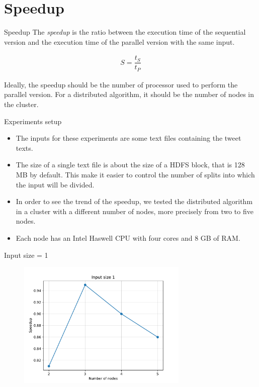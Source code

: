 \documentclass{beamer}
\begin{document}
\section{Speedup}

\begin{frame}{Speedup}
The \textit{speedup} is the ratio between the execution time of the sequential version and the execution time of the parallel version with the same input.

\begin{align*}
S = \dfrac{t_S}{t_P}
\end{align*}

Ideally, the speedup should be the number of processor used to perform the parallel version. For a distributed algorithm, it should be the number of nodes in the cluster.
\end{frame}


\begin{frame}{Experiments setup}

\begin{itemize}
\item
The inputs for these experiments are some text files containing the tweet texts.
\item
The size of a single text file is about the size of a HDFS block, that is 128 MB by default. This make it easier to control the number of splits into which the input will be divided.
\item
In order to see the trend of the speedup, we tested the distributed algorithm in a cluster with a different number of nodes, more precisely from two to five nodes.
\item
Each node has an Intel Haswell CPU with four cores and 8 GB of RAM.
\end{itemize}

\end{frame}


\begin{frame}{Input size = 1}
\begin{figure}[H]
\centering
\includegraphics[width=3.2in]{../Paper/fig/speedup1}
\end{figure}
\end{frame}
\end{document}
